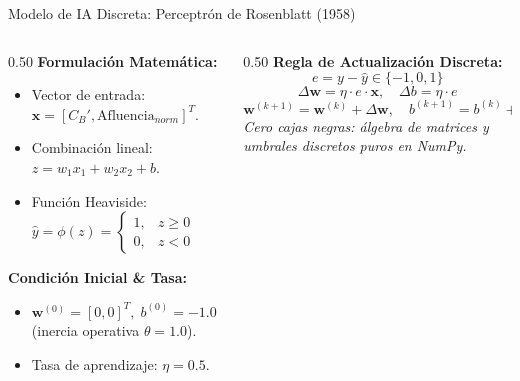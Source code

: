 \documentclass[aspectratio=169,10pt]{beamer}
\begin{document}
\begin{frame}{Modelo de IA Discreta: Perceptrón de Rosenblatt (1958)}
    \begin{columns}[T]
        \begin{column}{0.50\textwidth}
            \textbf{Formulación Matemática:}
            \begin{itemize}
                \item Vector de entrada: $\mathbf{x} = [C_B', \text{Afluencia}_{norm}]^T$.
                \item Combinación lineal: $z = w_1 x_1 + w_2 x_2 + b$.
                \item Función Heaviside: $\hat{y} = \phi(z) = \begin{cases} 1, & z \ge 0 \\ 0, & z < 0 \end{cases}$
            \end{itemize}
            \textbf{Condición Inicial \& Tasa:}
            \begin{itemize}
                \item $\mathbf{w}^{(0)} = [0, 0]^T, \; b^{(0)} = -1.0$ (inercia operativa $\theta=1.0$).
                \item Tasa de aprendizaje: $\eta = 0.5$.
            \end{itemize}
        \end{column}
        \begin{column}{0.50\textwidth}
            \textbf{Regla de Actualización Discreta:}
            $$e = y - \hat{y} \in \{-1, 0, 1\}$$
            $$\Delta \mathbf{w} = \eta \cdot e \cdot \mathbf{x}, \quad \Delta b = \eta \cdot e$$
            $$\mathbf{w}^{(k+1)} = \mathbf{w}^{(k)} + \Delta \mathbf{w}, \quad b^{(k+1)} = b^{(k)} + \Delta b$$
            \vspace{0.2cm}
            \textit{Cero cajas negras: álgebra de matrices y umbrales discretos puros en NumPy.}
        \end{column}
    \end{columns}
\end{frame}
\end{document}

